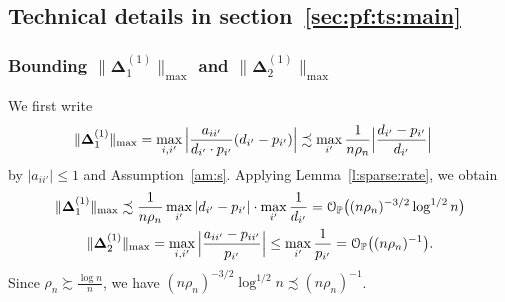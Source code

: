 \documentclass[10pt,journal,compsoc]{IEEEtran}
\newcommand{\op}{\mathcal{O}_{\mathbb{P}}}
\newcommand{\ee}{\end{aligned} \end{equation}}
\newcommand{\bee}{\begin{equation}\begin{aligned}}
\newcommand{\M}[1]{{{\mathbf{\MakeUppercase{#1}}}}}
\numberwithin{equation}{section}
\begin{document}
\subsection{Technical details in section~\ref{sec:pf:ts:main}}\label{app:c:ts:dt}
\subsubsection{Bounding  $\| \mathbf{\Delta}^{(1)}_1\|_{\max}$ and $\|\mathbf\Delta^{(1)}_2\|_{\max}$}\label{app:ts:dt:1}
We first write
\bee\nonumber
\| \M \Delta^{(1)}_1 \|_{\max} &= \max_{i,{i'}} \Big| \frac{a_{ii'}}{d_{i'} \cdot p_{i'}}(d_{i'} - p_{i'})\Big| 
\precsim \max_{i'}\frac{1}{n\rho_n}\Big| \frac{d_{i'} - p_{i'}}{d_{i'}}\Big|
\ee
by $|a_{ii'}| \leq 1$ and Assumption~\ref{am:s}. Applying Lemma~\ref{l:sparse:rate}, we obtain
\begin{gather}
\label{T1S:order_1_1:s}
\| \M \Delta^{(1)}_1 \|_{\max}\precsim \frac{1}{n\rho_n}\max_{i'}|d_{i'} - p_{i'}| \cdot \max_{i'}\frac{1}{d_{i'}}
= \op\big((n\rho_n)^{-3/2}\log^{1/2}{n}\big) \\
\label{T1S:order_1_2:s}
\|\M \Delta^{(1)}_2\|_{\max}  = \max_{i,{i'}}\Big| \frac{a_{ii'} - p_{ii'}}{p_{i'}}\Big| 
\leq \max_{i'} \frac{1}{p_{i'}} 
= \op\bigl((n\rho_n)^{-1}\bigr).
\end{gather}
Since $\rho_n \succsim \frac{\log n}{n}$, we have $(n\rho_n)^{-3/2} \log^{1/2}{n} \precsim (n\rho_n)^{-1}$.
\end{document}
